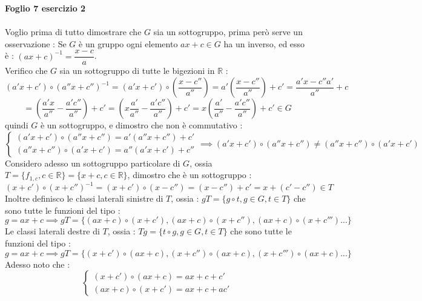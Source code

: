 \documentclass[12pt, letterpaper]{article}
\newcommand{\R}{{\mathbb R}}
\begin{document}
\textbf{Foglio 7 esercizio 2}\\\hphantom{}\\
Voglio prima di tutto dimostrare che \(G\) sia un sottogruppo, prima però serve un osservazione : Se 
\(G\) è un gruppo ogni elemento \(ax+c\in G\) ha un inverso, ed esso è : \((ax+c)^{-1}=\dfrac{x-c}{a}\).\\
Verifico che \(G\) sia un sottogruppo di tutte le bigezioni in \(\R\) :\begin{equation}
    (a'x+c')\circ(a''x+c'')^{-1}= (a'x+c')\circ(\dfrac{x-c''}{a''})=a'(\dfrac{x-c''}{a''})+c'=\dfrac{a'x-c''a'}{a''}+c
\end{equation}
\begin{equation}
    =(\dfrac{a'x}{a''}-\dfrac{a'c''}{a''})+c'=(x\dfrac{a'}{a''}-\dfrac{a'c''}{a''})+c'=x(\dfrac{a'}{a''}-\dfrac{a'c''}{a''})+c'\in G 
\end{equation}
quindi \(G\) è un sottogruppo, e dimostro che non è commutativo : 
\begin{equation}
    \begin{cases}
        (a'x+c')\circ(a''x+c'')=a'(a''x+c'')+c'\\
        (a''x+c'')\circ(a'x+c')=a''(a'x+c')+c''
    \end{cases}\implies (a'x+c')\circ(a''x+c'')\ne( a''x+c'')\circ(a'x+c')
\end{equation}
Considero adesso un sottogruppo particolare di \(G\), ossia \(T=\{f_{1,c},c\in\R\}=\{x+c, c\in \R\}\), dimostro che 
è un sottogruppo : \begin{equation}
    (x+c')\circ(x+c'')^{-1}= (x+c')\circ(x-c'')=(x-c'')+c'=x+(c'-c'')\in T
\end{equation}
Inoltre definisco le classi laterali sinistre di \(T\), ossia : 
\(gT=\{g\circ t, g\in G, t\in T\}\) che sono tutte le funzioni del tipo : \begin{equation}
    g=ax+c\implies gT=\{(ax+c)\circ (x+c'),(ax+c)\circ (x+c''),(ax+c)\circ (x+c''')...\}
\end{equation}
Le classi laterali destre di \(T\), ossia : 
\(Tg=\{t\circ g, g\in G, t\in T\}\) che sono tutte le funzioni del tipo : \begin{equation}
    g=ax+c\implies gT=\{(x+c')\circ(ax+c) ,(x+c'')\circ(ax+c),(x+c''')\circ(ax+c)...\}
\end{equation}
Adesso noto che :\begin{equation}
    \begin{cases}
        (x+c')\circ (ax+c)=ax+c+c'
        \\(ax+c)\circ (x+c')=ax+c+ac'
    \end{cases}
\end{equation}
\end{document}
